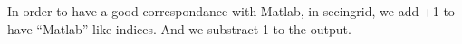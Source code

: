 In order to have a good correspondance with Matlab, in secingrid, we
add +1 to have ``Matlab''-like indices. And we substract 1 to the output.